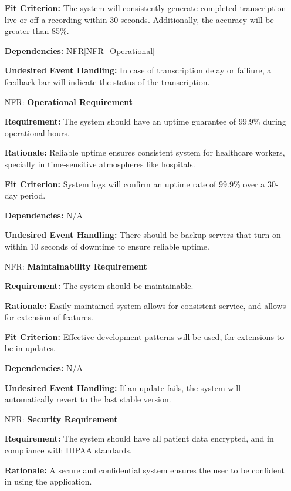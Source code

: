 \documentclass[12pt]{article}
\newcounter{nfrnum} %
\begin{document}
\begin{itemize}
    \textbf{Fit Criterion:} The system will consistently generate completed transcription live or off a recording within 30 seconds. Additionally, the accuracy will be greater than 85\%.

    \textbf{Dependencies:} NFR\ref{NFR_Operational}

    \textbf{Undesired Event Handling:} In case of transcription delay or failiure, a feedback bar will indicate the status of the transcription.

\item[NFR\refstepcounter{nfrnum}\thenfrnum \label{NFR_Operational}:] \textbf{Operational Requirement}

    \textbf{Requirement:} The system should have an uptime guarantee of 99.9\% during operational hours.

    \textbf{Rationale:} Reliable uptime ensures consistent system for healthcare workers, specially in time-sensitive atmospheres like hospitals.

    \textbf{Fit Criterion:} System logs will confirm an uptime rate of 99.9\% over a 30-day period.  

    \textbf{Dependencies:} N/A
    
    \textbf{Undesired Event Handling:} There should be backup servers that turn on within 10 seconds of downtime to ensure reliable uptime.

\item[NFR\refstepcounter{nfrnum}\thenfrnum \label{NFR_Maintainability}:] \textbf{Maintainability Requirement}

    \textbf{Requirement:} The system should be maintainable.

    \textbf{Rationale:} Easily maintained system allows for consistent service, and allows for extension of features.

    \textbf{Fit Criterion:} Effective development patterns will be used, for extensions to be in updates.

    \textbf{Dependencies:} N/A

    \textbf{Undesired Event Handling:} If an update fails, the system will automatically revert to the last stable version.

\item[NFR\refstepcounter{nfrnum}\thenfrnum \label{NFR_Security}:] \textbf{Security Requirement}

    \textbf{Requirement:} The system should have all patient data encrypted, and in compliance with HIPAA standards.

    \textbf{Rationale:} A secure and confidential system ensures the user to be confident in using the application.


\end{itemize}
\end{document}
